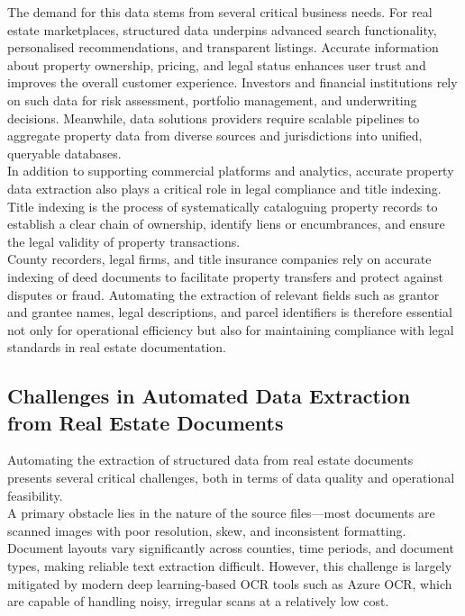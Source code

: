 \documentclass{article}
\begin{document}
The demand for this data stems from several critical business needs. For real estate marketplaces, structured data underpins advanced search functionality, personalised recommendations, and transparent listings. Accurate information about property ownership, pricing, and legal status enhances user trust and improves the overall customer experience. Investors and financial institutions rely on such data for risk assessment, portfolio management, and underwriting decisions. Meanwhile, data solutions providers require scalable pipelines to aggregate property data from diverse sources and jurisdictions into unified, queryable databases. \\

In addition to supporting commercial platforms and analytics, accurate property data extraction also plays a critical role in legal compliance and title indexing. Title indexing is the process of systematically cataloguing property records to establish a clear chain of ownership, identify liens or encumbrances, and ensure the legal validity of property transactions. \\

County recorders, legal firms, and title insurance companies rely on accurate indexing of deed documents to facilitate property transfers and protect against disputes or fraud. Automating the extraction of relevant fields such as grantor and grantee names, legal descriptions, and parcel identifiers is therefore essential not only for operational efficiency but also for maintaining compliance with legal standards in real estate documentation. \\

\subsection{Challenges in Automated Data Extraction from Real Estate Documents}

Automating the extraction of structured data from real estate documents presents several critical challenges, both in terms of data quality and operational feasibility. \\

A primary obstacle lies in the nature of the source files—most documents are scanned images with poor resolution, skew, and inconsistent formatting. Document layouts vary significantly across counties, time periods, and document types, making reliable text extraction difficult. However, this challenge is largely mitigated by modern deep learning-based OCR tools such as Azure OCR, which are capable of handling noisy, irregular scans at a relatively low cost. \\
\end{document}
